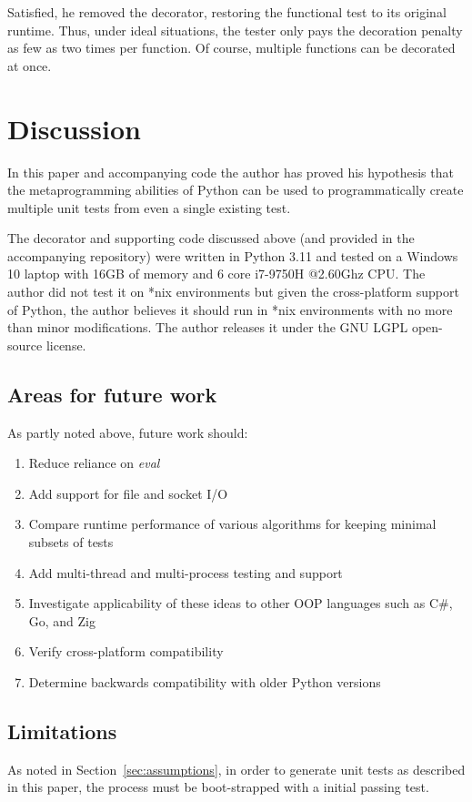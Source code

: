 \documentclass[10pt, conference]{IEEEtran}
\begin{document}
Satisfied, he removed the decorator, restoring the functional test to its 
original runtime. Thus, under ideal situations, the tester only pays the 
decoration penalty as few as two times per function.  Of course, multiple 
functions can be decorated at once.
 \section{Discussion}\label{sec:discussion}


In this paper and accompanying code the author
has proved his hypothesis that the metaprogramming abilities of 
Python can be used to programmatically create multiple 
unit tests from even a single existing test.

The decorator and supporting code discussed above
(and provided in the accompanying repository)
were written in Python 3.11 and tested on a 
Windows 10 laptop with 16GB of memory and 6 core i7-9750H @2.60Ghz CPU.
The author did not test it on *nix environments but given the
cross-platform support of Python, the author believes it should run in *nix 
environments with no more than minor modifications. The author releases it
under the GNU LGPL open-source license.

\subsection{Areas for future work}\label{sec:tuning-2}
As partly noted above, future work should: 
\begin{enumerate}
  \item Reduce reliance on \textit{eval}
  \item Add support for file and socket I/O
  \item Compare runtime performance of various algorithms for keeping minimal subsets of tests
  \item Add multi-thread and multi-process testing and support
  \item Investigate applicability of these ideas to other OOP languages such as C\#, Go, and Zig
  \item Verify cross-platform compatibility
  \item Determine backwards compatibility with older Python versions
\end{enumerate}

\subsection{Limitations}\label{sec:limitations}
As noted in Section~\ref{sec:assumptions}, in order to 
generate unit tests as described in this paper, the 
process must be boot-strapped with a initial passing test.
\end{document}
